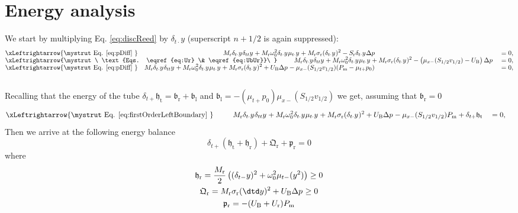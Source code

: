 \section{Energy analysis}
We start by multiplying Eq. \eqref{eq:discReed} by $\delta_{t\cdot}y$ (superscript $n+1/2$ is again suppressed):
\begin{alignat}{2}
    &\xLeftrightarrow{\mystrut\ \text{Eq. \eqref{eq:pDiff}}\ }\qquad\qquad\qquad\qquad\qquad\qquad\quad M_\text{r}\delta_{t\cdot}y^{\nph}\delta_{tt}y^{\nph} + M_\text{r}\omega_0^2\delta_{t\cdot}y^{\nph}\mu_{t\cdot}y^{\nph} + M_\text{r} \sigma_\text{r}(\delta_{t\cdot}y^{\nph})^2 - S_\text{r}\delta_{t\cdot}y^{\nph}\Delta p^{\nph} &&= 0,\nonumber\\[-5pt]
    &\xLeftrightarrow{\mystrut\ \text{Eqs. \eqref{eq:Ur} \& \eqref{eq:UbUr}}\ } \qquad \ \: M_\text{r}\delta_{t\cdot}y^{\nph}\delta_{tt}y^{\nph} + M_\text{r}\omega_0^2\delta_{t\cdot}y^{\nph}\mu_{t\cdot}y^{\nph} + M_\text{r} \sigma_\text{r}(\delta_{t\cdot}y^{\nph})^2 - \left(\mu_{x-}(S_{1/2}v_{1/2})-U_\text{B}\right)\Delta p^{\nph} &&= 0,\nonumber\\[-5pt]
    &\xLeftrightarrow{\mystrut\ \text{Eq. \eqref{eq:pDiff}}\ } \quad M_\text{r}\delta_{t\cdot}y^{\nph}\delta_{tt}y^{\nph} + M_\text{r}\omega_0^2\delta_{t\cdot}y^{\nph}\mu_{t\cdot}y^{\nph} + M_\text{r} \sigma_\text{r}(\delta_{t\cdot}y^{\nph})^2 + U_\text{B}\Delta p^{\nph}-\mu_{x-}(S_{1/2}v_{1/2})(P_\text{m} - \mu_{t+}p_0) &&= 0,\nonumber
\end{alignat}
\vspace{-5pt}\\
Recalling that the energy of the tube $\delta_{t+}\mathfrak{h}_\text{t} = \mathfrak{b}_\text{r} + \mathfrak{b}_\text{l}$ and $\mathfrak{b}_\text{l} = -(\mu_{t+}p_0)\mu_{x-}(S_{1/2}v_{1/2})$ we get, assuming that $\mathfrak{b}_\text{r} = 0$\vspace{-5pt}
\begin{alignat}{2}
    &\xLeftrightarrow{\mystrut\ \text{Eq. \eqref{eq:firstOrderLeftBoundary}}\ }\qquad\ \  M_\text{r}\delta_{t\cdot}y^{\nph}\delta_{tt}y^{\nph} + M_\text{r}\omega_0^2\delta_{t\cdot}y^{\nph}\mu_{t\cdot}y^{\nph} + M_\text{r} \sigma_\text{r}(\delta_{t\cdot}y^{\nph})^2 + U_\text{B}\Delta p^{\nph}-\mu_{x-}(S_{1/2}v_{1/2})P_\text{m} + \delta_{t+}\mathfrak{h}_\text{t} &&= 0,\nonumber
\end{alignat}
Then we arrive at the following energy balance
\begin{equation}
    \delta_{t+}\left(\mathfrak{h}_\text{t}+\mathfrak{h}_\text{r}\right) + \mathfrak{Q}_\text{r} + \mathfrak{p}_\text{r} = 0
\end{equation}
where
\begin{gather}
    \mathfrak{h}_\text{r} = \frac{M_\text{r}}{2}\left((\delta_{t-}y)^2+\omega_0^2\mu_{t-}(y^2)\right) \geq 0\\
    \mathfrak{Q}_\text{r} = M_\text{r}\sigma_\text{r}(\dtd y)^2 + U_\text{B}\Delta p^{\nph} \geq 0\\
    \mathfrak{p}_\text{r} = -(U_\text{B} + U_\text{r})P_\text{m}
\end{gather}

